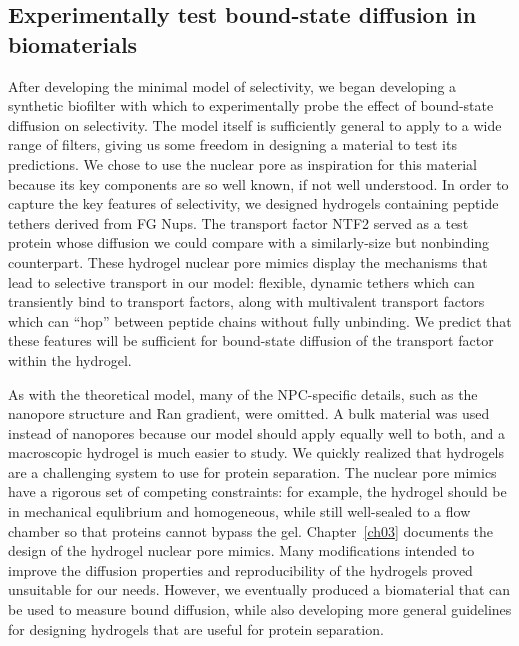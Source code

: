 \subsection{Experimentally test bound-state diffusion in biomaterials}

After developing the minimal model of selectivity, we began developing a synthetic biofilter with which to experimentally probe the effect of bound-state diffusion  on selectivity.  The model itself is sufficiently general to apply to a wide range of filters, giving us some freedom in designing a material to test its predictions.  We chose to use the nuclear pore as inspiration for this material because its key components are so well known, if not well understood.  In order to capture the key features of selectivity, we designed hydrogels containing peptide tethers derived from FG Nups.  The transport factor NTF2 served as a test protein whose diffusion we could compare with a similarly-size but nonbinding counterpart.  These hydrogel nuclear pore mimics display the mechanisms that lead to selective transport in our model: flexible, dynamic tethers which can transiently bind to transport factors, along with multivalent transport factors which can ``hop'' between peptide chains without fully unbinding.  We predict that these features will be sufficient for bound-state diffusion of the transport factor within the hydrogel.

As with the theoretical model, many of the NPC-specific details, such as the nanopore structure and Ran gradient, were omitted.  A bulk material was used instead of nanopores because our model should apply equally well to both, and a macroscopic hydrogel is much easier to study.  We quickly realized that hydrogels are a challenging system to use for protein separation.  The nuclear pore mimics have a rigorous set of competing constraints: for example, the hydrogel should be in mechanical equlibrium and homogeneous, while still well-sealed to a flow chamber so that proteins cannot bypass the gel.  Chapter~\ref{ch03} documents the design of the hydrogel nuclear pore mimics.  Many modifications intended to improve the diffusion properties and reproducibility of the hydrogels proved unsuitable for our needs.  However, we eventually produced a biomaterial that can be used to measure bound diffusion, while also developing more general guidelines for designing hydrogels that are useful for protein separation.

